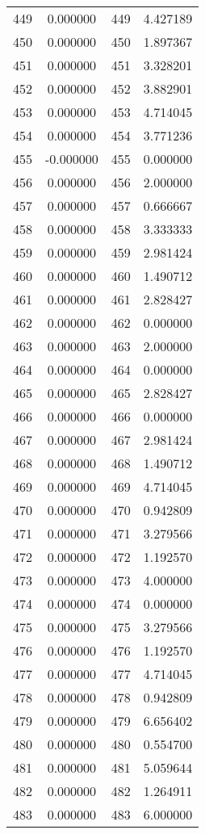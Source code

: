 \documentclass[12pt]{article}
\begin{document}
\begin{longtable}{@{}cccc@{}}
449 & 0.000000 & 449 & 4.427189 \\
450 & 0.000000 & 450 & 1.897367 \\
451 & 0.000000 & 451 & 3.328201 \\
452 & 0.000000 & 452 & 3.882901 \\
453 & 0.000000 & 453 & 4.714045 \\
454 & 0.000000 & 454 & 3.771236 \\
455 & -0.000000 & 455 & 0.000000 \\
456 & 0.000000 & 456 & 2.000000 \\
457 & 0.000000 & 457 & 0.666667 \\
458 & 0.000000 & 458 & 3.333333 \\
459 & 0.000000 & 459 & 2.981424 \\
460 & 0.000000 & 460 & 1.490712 \\
461 & 0.000000 & 461 & 2.828427 \\
462 & 0.000000 & 462 & 0.000000 \\
463 & 0.000000 & 463 & 2.000000 \\
464 & 0.000000 & 464 & 0.000000 \\
465 & 0.000000 & 465 & 2.828427 \\
466 & 0.000000 & 466 & 0.000000 \\
467 & 0.000000 & 467 & 2.981424 \\
468 & 0.000000 & 468 & 1.490712 \\
469 & 0.000000 & 469 & 4.714045 \\
470 & 0.000000 & 470 & 0.942809 \\
471 & 0.000000 & 471 & 3.279566 \\
472 & 0.000000 & 472 & 1.192570 \\
473 & 0.000000 & 473 & 4.000000 \\
474 & 0.000000 & 474 & 0.000000 \\
475 & 0.000000 & 475 & 3.279566 \\
476 & 0.000000 & 476 & 1.192570 \\
477 & 0.000000 & 477 & 4.714045 \\
478 & 0.000000 & 478 & 0.942809 \\
479 & 0.000000 & 479 & 6.656402 \\
480 & 0.000000 & 480 & 0.554700 \\
481 & 0.000000 & 481 & 5.059644 \\
482 & 0.000000 & 482 & 1.264911 \\
483 & 0.000000 & 483 & 6.000000 \\

\end{longtable}
\end{document}
